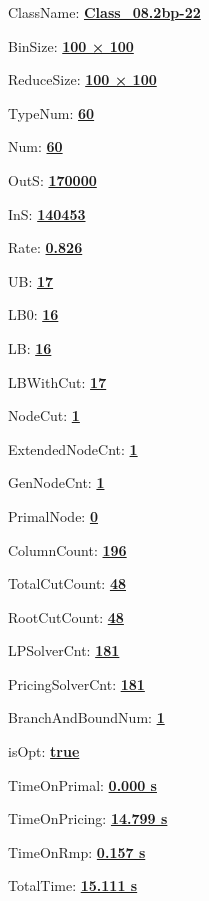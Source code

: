 \documentclass[11pt]{article}
\begin{document}
\pagestyle{empty}


ClassName: \underline{\textbf{Class_08.2bp-22}}
\par
BinSize: \underline{\textbf{100 × 100}}
\par
ReduceSize: \underline{\textbf{100 × 100}}
\par
TypeNum: \underline{\textbf{60}}
\par
Num: \underline{\textbf{60}}
\par
OutS: \underline{\textbf{170000}}
\par
InS: \underline{\textbf{140453}}
\par
Rate: \underline{\textbf{0.826}}
\par
UB: \underline{\textbf{17}}
\par
LB0: \underline{\textbf{16}}
\par
LB: \underline{\textbf{16}}
\par
LBWithCut: \underline{\textbf{17}}
\par
NodeCut: \underline{\textbf{1}}
\par
ExtendedNodeCnt: \underline{\textbf{1}}
\par
GenNodeCnt: \underline{\textbf{1}}
\par
PrimalNode: \underline{\textbf{0}}
\par
ColumnCount: \underline{\textbf{196}}
\par
TotalCutCount: \underline{\textbf{48}}
\par
RootCutCount: \underline{\textbf{48}}
\par
LPSolverCnt: \underline{\textbf{181}}
\par
PricingSolverCnt: \underline{\textbf{181}}
\par
BranchAndBoundNum: \underline{\textbf{1}}
\par
isOpt: \underline{\textbf{true}}
\par
TimeOnPrimal: \underline{\textbf{0.000 s}}
\par
TimeOnPricing: \underline{\textbf{14.799 s}}
\par
TimeOnRmp: \underline{\textbf{0.157 s}}
\par
TotalTime: \underline{\textbf{15.111 s}}
\par
\newpage


\end{document}
